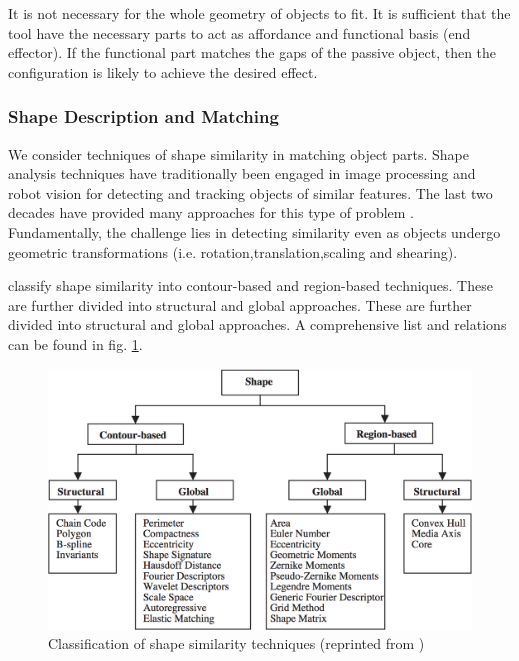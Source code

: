 \documentclass{article}
\begin{document}
It is not necessary for the whole geometry of objects to fit. 
It is sufficient that the tool have the necessary parts to act as affordance and functional basis (end effector\cite{zhu2015}).
If the functional part matches the gaps of the passive object, then the configuration is likely to achieve the desired effect. 

\subsubsection{Shape Description and Matching}
We consider techniques of shape similarity in matching object parts.
Shape analysis techniques have traditionally been engaged in image processing and robot vision for detecting and tracking objects of similar features.
The last two decades have provided many approaches for this type of problem \cite{loncaric1998,zhang2004,veltkamp2001,robert2012}.
Fundamentally, the challenge lies in detecting similarity even as objects undergo geometric transformations (i.e. rotation,translation,scaling and shearing).     

\cite{zhang2004} classify shape similarity into contour-based and region-based techniques. These are further divided into structural and global approaches.
These are further divided into structural and global approaches.
A comprehensive list and relations can be found in fig. \ref{fig:shape_similarity}. 

\begin{figure}[b]
  \centering
  \includegraphics[width=1\textwidth]{./figures/similarity_techniques.png}
  \caption{Classification of shape similarity techniques (reprinted from \cite{zhang2004})}
  \label{fig:shape_similarity}
\end{figure}  
\end{document}
